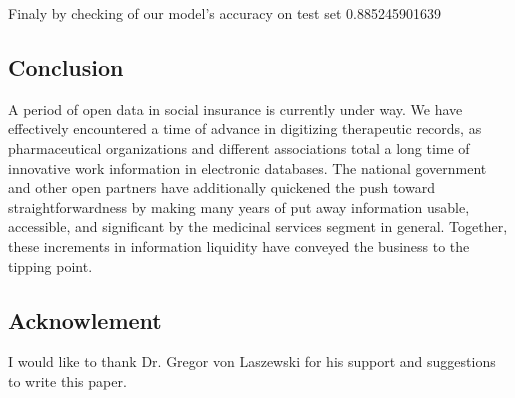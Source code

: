 \documentclass[sigconf]{acmart}
\begin{document}
Finaly by checking of our model's accuracy on test set
0.885245901639


\subsection{Conclusion}

A period of open data in social insurance is currently under way. We have effectively encountered a time of advance in digitizing therapeutic records, as pharmaceutical organizations and different associations total a long time of innovative work information in electronic databases. The national government and other open partners have additionally quickened the push toward straightforwardness by making many years of put away information usable, accessible, and significant by the medicinal services segment in general. Together, these increments in information liquidity have conveyed the business to the tipping point.


\subsection{Acknowlement}

  I would like to thank Dr. Gregor von Laszewski for his
  support and suggestions to write this paper.




    
    
    


    
    
    
    
\end{document}
